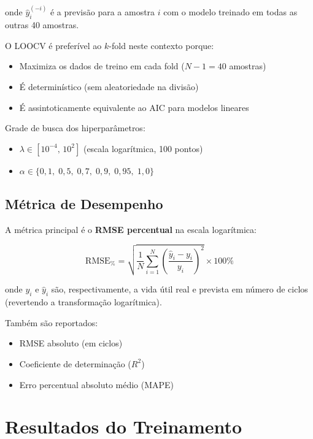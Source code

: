 \documentclass[12pt,a4paper]{article}
\begin{document}
onde $\hat{y}_i^{(-i)}$ \'{e} a previs\~ao para a amostra $i$ com o modelo
treinado em todas as outras 40 amostras.

O LOOCV \'{e} prefer\'{i}vel ao $k$-fold neste contexto porque:
\begin{itemize}
  \item Maximiza os dados de treino em cada fold ($N-1 = 40$ amostras)
  \item \'{E} determin\'{i}stico (sem aleatoriedade na divis\~ao)
  \item \'{E} assintoticamente equivalente ao AIC para modelos lineares
\end{itemize}

Grade de busca dos hiperpar\^{a}metros:
\begin{itemize}
  \item $\lambda \in [10^{-4},\, 10^{2}]$ (escala logar\'{i}tmica, 100 pontos)
  \item $\alpha \in \{0{,}1,\; 0{,}5,\; 0{,}7,\; 0{,}9,\; 0{,}95,\; 1{,}0\}$
\end{itemize}

\subsection{M\'{e}trica de Desempenho}

A m\'{e}trica principal \'{e} o \textbf{RMSE percentual} na escala logar\'{i}tmica:

\begin{equation}
  \text{RMSE}_{\%} = \sqrt{\frac{1}{N}\sum_{i=1}^{N}
    \left(\frac{\hat{y}_i - y_i}{y_i}\right)^2} \times 100\%
\end{equation}

onde $y_i$ e $\hat{y}_i$ s\~ao, respectivamente, a vida \'{u}til real e prevista
em n\'{u}mero de ciclos (revertendo a transforma\c{c}\~ao logar\'{i}tmica).

Tamb\'{e}m s\~ao reportados:
\begin{itemize}
  \item RMSE absoluto (em ciclos)
  \item Coeficiente de determina\c{c}\~ao ($R^2$)
  \item Erro percentual absoluto m\'{e}dio (MAPE)
\end{itemize}

\section{Resultados do Treinamento}
\end{document}
